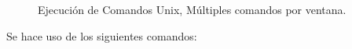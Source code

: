 \documentclass[paper=a4, fontsize=12pt]{article}        %
\numberwithin{equation}{section}                        %
\numberwithin{table}{section}                           %
\begin{document}
\begin{figure}[H]
{{        }}
        \hfill
    \caption{Ejecución de Comandos Unix, Múltiples comandos por ventana.}
\end{figure}
Se hace uso de los siguientes comandos: 
\end{document}
